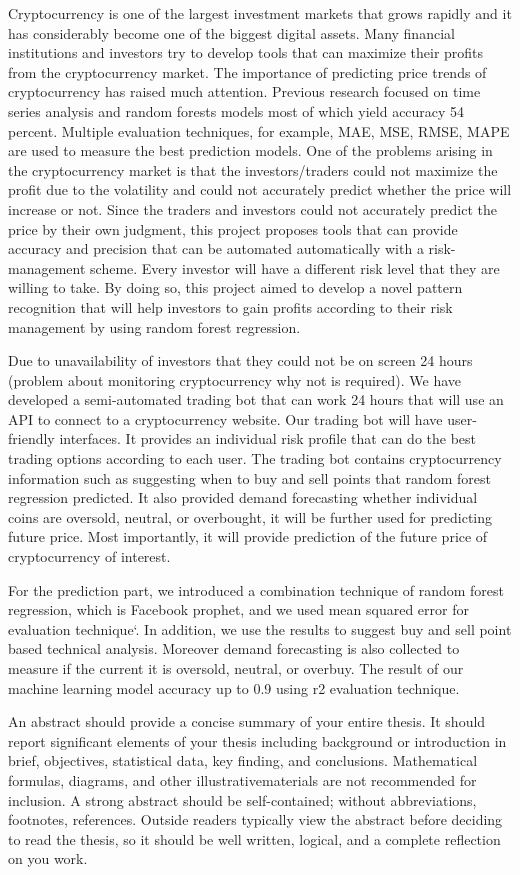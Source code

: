 Cryptocurrency is one of the largest investment markets that grows rapidly and it has considerably become one of the biggest digital assets. Many financial institutions and investors try to develop tools that can maximize their profits from the cryptocurrency market. The importance of predicting price trends of cryptocurrency  has raised much attention. Previous research focused on time series analysis and random forests models most of which yield accuracy 54 percent. Multiple evaluation techniques, for example, MAE, MSE, RMSE, MAPE are used to measure the best prediction models. One of the problems arising in the cryptocurrency market is that the investors/traders could not maximize the profit due to the volatility and could not accurately predict whether the price will increase or not. Since the traders and investors could not accurately predict the price by their own judgment, this project proposes tools that can provide accuracy and precision that can be automated automatically with a risk-management scheme. Every investor will have a different risk level that they are willing to take. By doing so, this project aimed to develop a novel pattern recognition that will help investors to gain profits according to their risk management by using random forest regression. 

Due to unavailability of investors that they could not be on screen 24 hours (problem about monitoring cryptocurrency why not is required). We have developed a semi-automated trading bot that can work 24 hours that will use an API to connect to a cryptocurrency website. Our trading bot will have user-friendly interfaces. It provides an individual risk profile that can do the best trading options according to each user. The trading bot contains cryptocurrency information such as suggesting when to buy and sell points that random forest regression predicted. It also provided demand forecasting whether individual coins are oversold, neutral, or overbought, it will be further used for predicting future price. Most importantly, it will provide prediction of the future price of cryptocurrency of interest.

For the prediction part, we introduced a combination technique of random forest regression, which is Facebook prophet,  and we used mean squared error for evaluation technique`. In addition, we use the results to suggest buy and sell point based technical analysis. Moreover demand forecasting is also collected to measure if the current it is oversold, neutral, or overbuy. The result of our machine learning model accuracy up to 0.9 using r2 evaluation technique.


An abstract should provide a concise summary of your entire thesis. It should report significant elements of your thesis including background or introduction in brief, objectives, statistical data, key finding, and conclusions. Mathematical formulas, diagrams, and other illustrativematerials are not recommended for inclusion. A strong abstract should be self-contained; without abbreviations, footnotes, references. Outside readers typically view the abstract before deciding to read the thesis, so it should be well written, logical, and a complete reflection on you work.


\contentsname